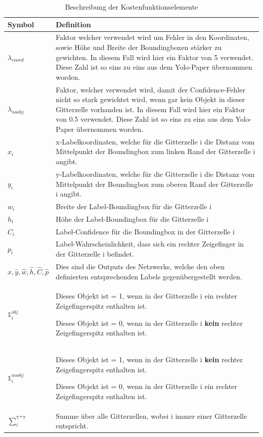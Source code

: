 \begin{table}
\centering
\begin{tabularx}{\textwidth}{|l|X|}
\hline  \textbf{Symbol} & \textbf{Definition}\\
\hline  $\lambda_{coord}$  & Faktor welcher verwendet wird um Fehler in den Koordinaten, sowie Höhe und Breite der Boundingboxen stärker zu gewichten. In diesem Fall wird hier ein Faktor von 5 verwendet. Diese Zahl ist so eins zu eins aus dem Yolo-Paper \cite{yolo} übernommen worden.\\
\hline  $\lambda_{noobj}$  & Faktor, welcher verwendet wird, damit der Confidence-Fehler nicht so stark gewichtet wird, wenn gar kein Objekt in dieser Gitterzelle vorhanden ist. In diesem Fall wird hier ein Faktor von 0.5 verwendet. Diese Zahl ist so eins zu eins aus dem Yolo-Paper \cite{yolo} übernommen worden.\\
\hline  $x_i$  & x-Labelkoordinaten, welche für die Gitterzelle i die Distanz vom Mittelpunkt der Boundingbox zum linken Rand der Gitterzelle i angibt.\\
\hline  $y_i$  & y-Labelkoordinaten, welche für die Gitterzelle i die Distanz vom Mittelpunkt der Boundingbox zum oberen Rand der Gitterzelle i angibt.\\
\hline  $w_i$  & Breite der Label-Boundingbox für die Gitterzelle i\\
\hline  $h_i$  & Höhe der Label-Boundingbox für die Gitterzelle i\\
\hline  $C_i$  & Label-Confidence für die Boundingbox in der Gitterzelle i\\
\hline  $p_i$  & Label-Wahrscheinlichkeit, dass sich ein rechter Zeigefinger in der Gitterzelle i befindet. \\	
\hline  $\hat{x},\hat{y},\hat{w},\hat{h},\hat{C},\hat{p}$  & Dies sind die Outputs des Netzwerks, welche den oben definierten entsprechenden Labels gegenübergestellt werden.\\
\hline  $\mathds{1}_{i}^{obj}$  & Dieses Objekt ist = 1, wenn in der Gitterzelle i ein rechter Zeigefingerspitz enthalten ist. 

Dieses Objekt ist = 0, wenn in der Gitterzelle i \textbf{kein} rechter Zeigefingerspitz enthalten ist.\\	
\hline  $\mathds{1}_{i}^{noobj}$  & Dieses Objekt ist = 1, wenn in der Gitterzelle i \textbf{kein} rechter Zeigefingerspitz enthalten ist. 

Dieses Objekt ist = 0, wenn in der Gitterzelle i ein rechter Zeigefingerspitz enthalten ist.\\
\hline $\sum_{i}^{7*7}$ & Summe über alle Gitterzellen, wobei i immer einer Gitterzelle entspricht.\\
\hline
\end{tabularx}
\caption{Beschreibung der Kostenfunktionselemente}
\label{tbl:beschr_kostenfuntion}
\end{table} 

